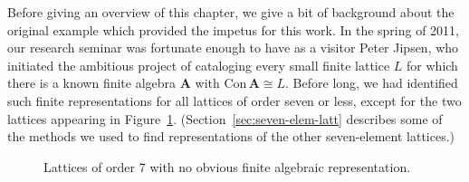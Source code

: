 \documentclass[cm,dissertation]{uhthesis}
\theoremstyle{plain}
\theoremstyle{definition}
\theoremstyle{remark}
\numberwithin{theorem}{section}
\numberwithin{claim}{chapter}
\numberwithin{equation}{section}
\numberwithin{conjecture}{chapter}
\newcommand{\<}{\ensuremath{\langle}}
\renewcommand{\>}{\ensuremath{\rangle}}
\newcommand{\Con}{\ensuremath{\mathrm{Con\,}}}
\newcommand{\0}{\ensuremath{\mathbf{0}}}
\newcommand{\1}{\ensuremath{\mathbf{1}}}
\newcommand{\2}{\ensuremath{\mathbf{2}}}
\newcommand{\3}{\ensuremath{\mathbf{3}}}
\newcommand{\4}{\ensuremath{\mathbf{4}}}
\newcommand{\5}{\ensuremath{\mathbf{5}}}
\newcommand{\bA}{\ensuremath{\mathbf{A}}}
\begin{document}
Before giving an overview of this chapter, we give a bit of background about the
original example which provided the impetus for this work.  In the spring of
2011, our research seminar was fortunate enough to have 
as a visitor 
%
Peter Jipsen, who initiated the ambitious project of
cataloging every small finite lattice $L$ for which there is a known finite algebra
$\bA$ with $\Con\bA\cong L$.  Before long, we had identified such finite
representations for all lattices of order seven or less, except for the two
lattices appearing in Figure~\ref{fig:sevens}.
(Section~\ref{sec:seven-elem-latt} describes some of the methods we used to find
representations of the other seven-element lattices.)
\begin{figure}[h!]
  \centering
  

  \caption{Lattices of order 7 with no obvious finite algebraic representation.}
  \label{fig:sevens}
\end{figure}
\end{document}
